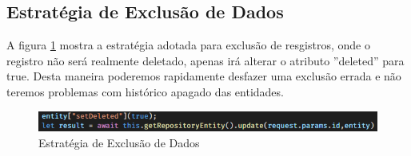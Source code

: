 \subsection{Estratégia de Exclusão de Dados}

A figura \ref{code_server_delete-strategy} mostra a estratégia adotada para exclusão de resgistros, onde o registro não será realmente deletado, apenas irá alterar o atributo ''deleted'' para true. Desta maneira poderemos rapidamente desfazer uma exclusão errada e não teremos problemas com histórico apagado das entidades.

\begin{figure}[htb]
	\caption{\label{code_server_delete-strategy}Estratégia de Exclusão de Dados}
	\begin{center}
		\includegraphics[scale=0.90]{./Figuras/code/server/delete-strategy.png}
	\end{center}
\end{figure}
